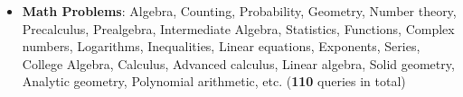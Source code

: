 \begin{itemize}[noitemsep, topsep=0pt, leftmargin=*]
    \item \textbf{Math Problems}: Algebra, Counting, Probability, Geometry, Number theory, Precalculus, Prealgebra, Intermediate Algebra, Statistics, Functions, Complex numbers, Logarithms, Inequalities, Linear equations, Exponents, Series, College Algebra, Calculus, Advanced calculus, Linear algebra, Solid geometry, Analytic geometry, Polynomial arithmetic, etc. (\textbf{110} queries in total)

\end{itemize}
